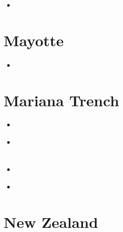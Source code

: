 \begin{small}
\begin{itemize}
\item[\twothousandtwenty]
\end{itemize}
\end{small}

\section{Mayotte}

\begin{small}
\begin{itemize}
\item[\twothousandtwentyfour]
\end{itemize}
\end{small}

\section{Mariana Trench}

\begin{small}
\begin{itemize}
\item[\nineteenninetytwo]
\item[\twothousandfifteen]
\\
\\
\item[\twothousandeighteen]
\item[\twothousandtwentythree]
\\
\end{itemize}
\end{small}


\section{New Zealand} 

